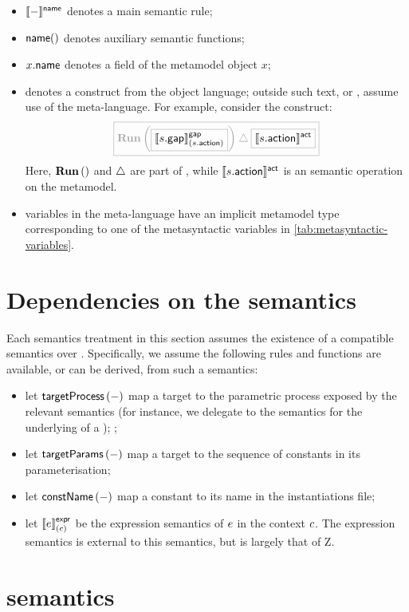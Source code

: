 \begin{itemize}
\item
	\(\llbracket - \rrbracket^{\mathsf{name}}\) denotes a main semantic rule;
\item
	\(\mathsf{name}()\) denotes auxiliary semantic functions;
\item
	\(x.\mathsf{name}\) denotes a field of the metamodel object \(x\);
\item
	 denotes a construct from the object
	language; outside such text, or ,
	assume use of the meta-language.  For example, consider the \tockcsp{}
	construct:
	\[\tlang{
		\runproc{\olang{\gapsema{\field{\astep}{gap}}{\field{\astep}{action}}}}
		\interrupt \olang{\actsema{\field{\astep}{action}}}
	}\]
	Here, \(\operatorname{\mathbf{Run}}\left(\right)\) and \(\mathbin{\triangle}\) are part of \tockcsp, while
	\(\llbracket s.\mathsf{action} \rrbracket^{\mathsf{act}}\) is an semantic operation on the
	\langname{} metamodel.
\item
	variables in the meta-language have an implicit metamodel type
	corresponding to one of the metasyntactic variables in
	\cref{tab:metasyntactic-variables}.
\end{itemize}

\section{Dependencies on the \robochart{} semantics}

\newcommand{\targetProcess}[1]{\ensuremath{\funcname{targetProcess}\left(#1\right)}}
\newcommand{\targetParams}[1]{\ensuremath{\funcname{targetParams}\left(#1\right)}}
\newcommand{\constName}[1]{\ensuremath{\funcname{constName}\left(#1\right)}}


Each semantics treatment in this section assumes the existence of a compatible
semantics over \robochart.  Specifically, we assume the following rules and
functions are available, or can be derived, from such a semantics:

\begin{itemize}
\item
	let \targetProcess{-} map a target to the parametric
	process exposed by the relevant \tockcsp{} semantics (for instance,
	we delegate to the \robochart{} semantics for the underlying
	\mrcmodule{} of a \mrcmoduletarget);
	;
\item
	let \targetParams{-} map a target to the sequence of
	constants in its parameterisation;
\item
	let \constName{-} map a constant to its name in the \robochart{}
	instantiations file;
\item
	let \(\llbracket e \rrbracket^{\mathsf{expr}}_{(c)}\) be the expression semantics of 
	\(e\) in the context \(c\).  The expression semantics
	is external to this semantics, but is largely that of Z.
\end{itemize}

\section{\tockcsp{} semantics}\label{sec:semantics-tockcsp}


